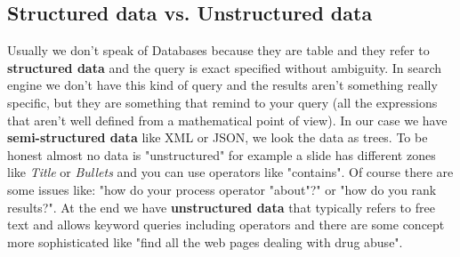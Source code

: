 \subsection{Structured data vs. Unstructured data}
Usually we don't speak of Databases because they are table and they refer to \textbf{structured data} and the query is exact specified without ambiguity. In search engine we don't have this kind of query and the results aren't something really specific, but they are something that remind to your query (all the expressions that aren't well defined from a mathematical point of view).\newline
In our case we have \textbf{semi-structured data} like XML or JSON, we look the data as trees. To be honest almost no data is "unstructured" for example a slide has different zones like \textit{Title} or \textit{Bullets} and you can use operators like "contains".
Of course there are some issues like: "how do your process operator "about"?" or "how do you rank results?".\newline
At the end we have \textbf{unstructured data} that typically refers to free text and allows keyword queries including operators and there are some concept more sophisticated like "find all the web pages dealing with drug abuse".

